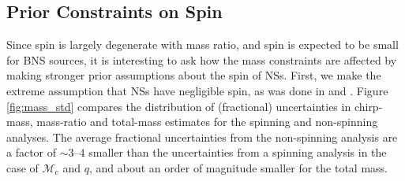 \subsection{Prior Constraints on Spin}
\label{subsec:prior_constraints}

Since spin is largely degenerate with mass ratio, and spin is expected to be small for BNS sources, it is interesting to ask how the mass constraints are affected by making stronger prior assumptions about the spin of NSs.  First, we make the extreme assumption that NSs have negligible spin, as was done in \citet{Singer_2014} and \citet{Berry_2014}.  Figure \ref{fig:mass_std} compares the distribution of (fractional) uncertainties in chirp-mass, mass-ratio and total-mass estimates for the spinning and non-spinning analyses. The average fractional uncertainties from the non-spinning analysis are a factor of $\sim3$--$4$ smaller than the uncertainties from a spinning analysis in the case of $\mathcal{M}_\mathrm{c}$ and $q$, and about an order of magnitude smaller for the total mass.
  
  
  
  
  
  
  
  
  
  
  
  
  
  
  